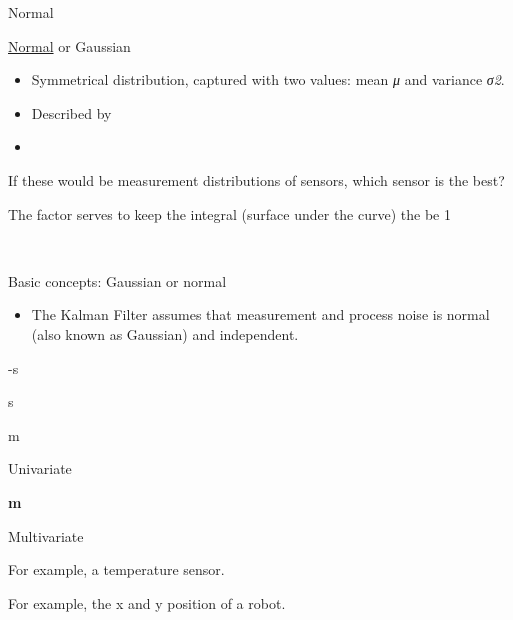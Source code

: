 \documentclass[compress]{beamer}
\providecommand{\tightlist}{%
  \setlength{\itemsep}{0pt}\setlength{\parskip}{0pt}}
\begin{document}
\begin{frame}{Normal}


\href{http://en.wikipedia.org/wiki/Normal_distribution}{Normal} or
Gaussian

\begin{itemize}
\tightlist
\item
  Symmetrical distribution, captured with two values: mean \emph{μ} and
  variance \emph{σ2}.
\item
  Described by
\end{itemize}

\begin{itemize}
\tightlist
\item
  ~
\end{itemize}

If these would be measurement distributions of sensors, which sensor is
the best?

The factor serves to keep the integral (surface under the curve) the be
1

~

\end{frame}

\begin{frame}{Basic concepts: Gaussian or normal}

\begin{itemize}
\tightlist
\item
  The Kalman Filter assumes that measurement and process noise is normal
  (also known as Gaussian) and independent.
\end{itemize}

-s

s

m

Univariate

\textbf{m}

Multivariate

For example, a temperature sensor.

For example, the x and y position of a robot.

\end{frame}
\end{document}
